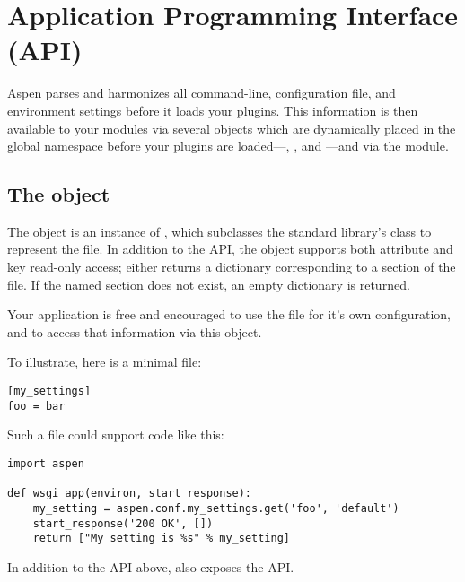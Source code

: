 \chapter{Application Programming Interface (API) \label{api}}

Aspen parses and harmonizes all command-line, configuration file, and
environment settings before it loads your plugins. This information is then
available to your modules via several objects which are dynamically placed in
the global  namespace before your plugins are
loaded---, , and ---and via the
 module.


\section{The  object}
\label{api-conf}

The  object is an instance of
, which subclasses the standard library's
 class to represent the
 file. In addition to the  API,
the object supports both attribute and key read-only access; either returns a
dictionary corresponding to a section of the  file. If the
named section does not exist, an empty dictionary is returned.

Your application is free and encouraged to use the  file for
it's own configuration, and to access that information via this object.

To illustrate, here is a minimal  file:

\begin{verbatim}
[my_settings]
foo = bar
\end{verbatim}

Such a file could support code like this:

\begin{verbatim}
import aspen

def wsgi_app(environ, start_response):
    my_setting = aspen.conf.my_settings.get('foo', 'default')
    start_response('200 OK', [])
    return ["My setting is %s" % my_setting]
\end{verbatim}


\begin{seealso}

{}{In addition to the API above,  also
exposes the  API.}

\end{seealso}


